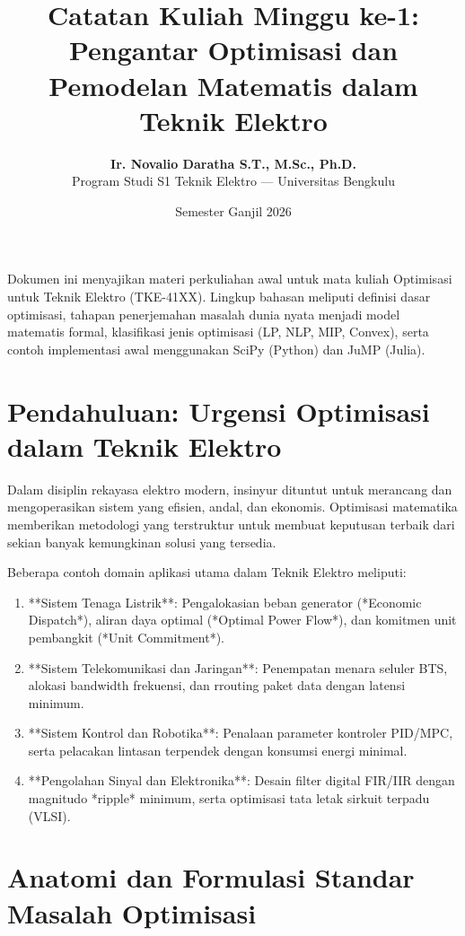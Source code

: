 \documentclass[11pt,a4paper]{article}
\title{\textbf{Catatan Kuliah Minggu ke-1:}\\Pengantar Optimisasi dan Pemodelan Matematis dalam Teknik Elektro}
\author{\textbf{Ir. Novalio Daratha S.T., M.Sc., Ph.D.}\\Program Studi S1 Teknik Elektro --- Universitas Bengkulu}
\date{Semester Ganjil 2026}
\begin{document}
\maketitle

\begin{tcolorbox}[colback=unibblue!5,colframe=unibblue,title=\textbf{Ringkasan Eksekutif Pertemuan ke-1}]
Dokumen ini menyajikan materi perkuliahan awal untuk mata kuliah Optimisasi untuk Teknik Elektro (TKE-41XX). Lingkup bahasan meliputi definisi dasar optimisasi, tahapan penerjemahan masalah dunia nyata menjadi model matematis formal, klasifikasi jenis optimisasi (LP, NLP, MIP, Convex), serta contoh implementasi awal menggunakan SciPy (Python) dan JuMP (Julia).
\end{tcolorbox}

\tableofcontents
\newpage

\section{Pendahuluan: Urgensi Optimisasi dalam Teknik Elektro}
Dalam disiplin rekayasa elektro modern, insinyur dituntut untuk merancang dan mengoperasikan sistem yang efisien, andal, dan ekonomis. Optimisasi matematika memberikan metodologi yang terstruktur untuk membuat keputusan terbaik dari sekian banyak kemungkinan solusi yang tersedia.

Beberapa contoh domain aplikasi utama dalam Teknik Elektro meliputi:
\begin{enumerate}
    \item **Sistem Tenaga Listrik**: Pengalokasian beban generator (*Economic Dispatch*), aliran daya optimal (*Optimal Power Flow*), dan komitmen unit pembangkit (*Unit Commitment*).
    \item **Sistem Telekomunikasi dan Jaringan**: Penempatan menara seluler BTS, alokasi bandwidth frekuensi, dan rrouting paket data dengan latensi minimum.
    \item **Sistem Kontrol dan Robotika**: Penalaan parameter kontroler PID/MPC, serta pelacakan lintasan terpendek dengan konsumsi energi minimal.
    \item **Pengolahan Sinyal dan Elektronika**: Desain filter digital FIR/IIR dengan magnitudo *ripple* minimum, serta optimisasi tata letak sirkuit terpadu (VLSI).
\end{enumerate}

\section{Anatomi dan Formulasi Standar Masalah Optimisasi}
\end{document}
